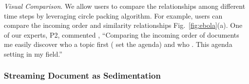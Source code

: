 \emph{\normalsize Visual Comparison}.
We allow users to compare the relationships among different time steps by leveraging  circle packing algorithm.
For example, users can compare the incoming order and similarity relationships Fig.~\ref{fig:ebola}(a).
One of our experts, P2, commented , ``Comparing the incoming order of documents  me easily discover who  a topic first ( set the agenda) and who .
This    agenda setting in my field.''

\subsubsection{Streaming Document as Sedimentation}


